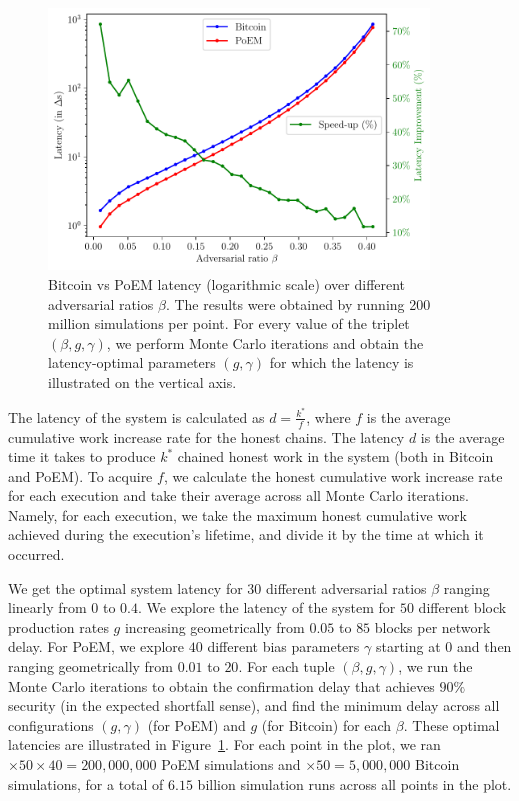 \begin{figure}[h]
    \centering
    \includegraphics[width = 0.9\textwidth]{figures/bitcoin_vs_poem.pdf}

    \caption{Bitcoin vs PoEM latency (logarithmic scale) over different adversarial ratios $\beta$.
             The results were obtained by running 200 million simulations per point.
             For every value of the triplet $(\beta, g, \gamma)$, we perform
             \montecarlo{} Monte Carlo iterations and obtain the latency-optimal parameters
             $(g, \gamma)$ for which the latency is illustrated on the vertical axis.}
    \label{fig:bitcoin_vs_poem}
\end{figure}

The latency of the system is calculated as $d = \frac{k^*}{f}$, where $f$ is the average cumulative work increase rate for the honest chains.
The latency $d$ is the average time it takes to produce $k^*$ chained honest work in the system (both in Bitcoin and PoEM).
To acquire $f$, we calculate the honest cumulative work increase rate for each execution and take their average across all Monte Carlo iterations.
Namely, for each execution, we take the maximum honest cumulative work achieved during the execution's lifetime, and divide it by the time
at which it occurred.

We get the optimal system latency for $30$ different adversarial ratios $\beta$ ranging linearly from $0$ to $0.4$.
We explore the latency of the system for $50$ different block production rates $g$ increasing geometrically from $0.05$ to $85$ blocks per network delay.
For PoEM, we explore $40$ different bias parameters $\gamma$ starting at $0$ and then ranging geometrically from $0.01$ to $20$.
For each tuple $(\beta, g, \gamma)$, we run the \montecarlo{} Monte Carlo iterations to obtain the
confirmation delay that achieves $90\%$ security (in the expected shortfall sense), and find the minimum delay across all configurations $(g, \gamma)$ (for PoEM)
and $g$ (for Bitcoin) for each $\beta$.
These optimal latencies are illustrated in Figure~\ref{fig:bitcoin_vs_poem}.
For each point in the plot, we ran \montecarlo$ \times 50 \times 40 = 200{,}000{,}000$ PoEM simulations
and \montecarlo$ \times 50 = 5{,}000{,}000$ Bitcoin simulations,
for a total of $6.15$ billion simulation runs across all points in the plot.


